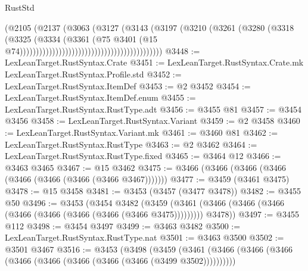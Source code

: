 \begin{lexlean}{RustStd}
\begin{coremodule}
                                                              (@2105
                                                                (@2137
                                                                  (@3063
                                                                    (@3127
                                                                      (@3143
                                                                        (@3197
                                                                          (@3210
                                                                            (@3261
                                                                              (@3280
                                                                                (@3318
                                                                                  (@3325
                                                                                    (@3334
                                                                                      (@3361
                                                                                        (@75
                                                                                          @3401
                                                                                          (@15
                                                                                            @74))))))))))))))))))))))))))))))))))))))))))))
@3448 := LexLeanTarget.RustSyntax.Crate
@3451 := LexLeanTarget.RustSyntax.Crate.mk LexLeanTarget.RustSyntax.Profile.std
@3452 := LexLeanTarget.RustSyntax.ItemDef
@3453 := @2 @3452
@3454 := LexLeanTarget.RustSyntax.ItemDef.enum
@3455 := LexLeanTarget.RustSyntax.RustType.adt
@3456 := @3455 @81
@3457 := @3454 @3456
@3458 := LexLeanTarget.RustSyntax.Variant
@3459 := @2 @3458
@3460 := LexLeanTarget.RustSyntax.Variant.mk
@3461 := @3460 @81
@3462 := LexLeanTarget.RustSyntax.RustType
@3463 := @2 @3462
@3464 := LexLeanTarget.RustSyntax.RustType.fixed
@3465 := @3464 @12
@3466 := @3463 @3465
@3467 := @15 @3462
@3475 := @3466 (@3466 (@3466 (@3466 (@3466 (@3466 (@3466 (@3466 @3467)))))))
@3477 := @3459 (@3461 @3475)
@3478 := @15 @3458
@3481 := @3453 (@3457 (@3477 @3478))
@3482 := @3455 @50
@3496 := @3453
    (@3454
      @3482
      (@3459 (@3461 (@3466 (@3466 (@3466 (@3466 (@3466 (@3466 (@3466 (@3466 @3475))))))))) @3478))
@3497 := @3455 @112
@3498 := @3454 @3497
@3499 := @3463 @3482
@3500 := LexLeanTarget.RustSyntax.RustType.nat
@3501 := @3463 @3500
@3502 := @3501 @3467
@3516 := @3453
    (@3498
      (@3459
        (@3461 (@3466 (@3466 (@3466 (@3466 (@3466 (@3466 (@3466 (@3466 (@3499 @3502))))))))))

\end{coremodule}
\end{lexlean}
